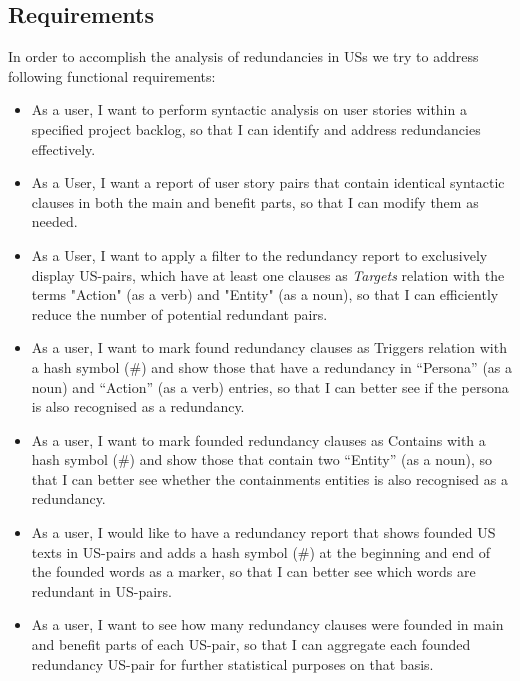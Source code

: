 \subsection{Requirements}\label{redundancy_requirement}
In order to accomplish the analysis of redundancies in USs we try to address following functional requirements:
\begin{itemize}

\item As a user, I want to perform syntactic analysis on user stories within a specified project backlog, so that I can identify and address redundancies effectively.

\item As a User, I want a report of user story pairs that contain identical syntactic clauses in both the main and benefit parts, so that I can modify them as needed.

\item As a User, I want to apply a filter to the redundancy report to exclusively display US-pairs, which have at least one clauses as \textit{Targets} relation with the terms "Action" (as a verb) and "Entity" (as a noun), so that I can efficiently reduce the number of potential redundant pairs.

\item As a user, I want to mark found redundancy clauses as Triggers relation with a hash symbol (\#) and show those that have a redundancy in \enquote{Persona} (as a noun) and \enquote{Action} (as a verb) entries, so that I can better see if the persona is also recognised as a redundancy.

\item As a user, I want to mark founded redundancy clauses as Contains with a hash symbol (\#) and show those that contain two \enquote{Entity} (as a noun), so that I can better see whether the containments entities is also recognised as a redundancy.

\item As a user, I would like to have a redundancy report that shows founded US texts in US-pairs and adds a hash symbol (\#) at the beginning and end of the founded words as a marker, so that I can better see which words are redundant in US-pairs.

\item As a user, I want to see how many redundancy clauses were founded in main and benefit parts of each US-pair, so that I can aggregate each founded redundancy US-pair for further statistical purposes on that basis.


\end{itemize}
